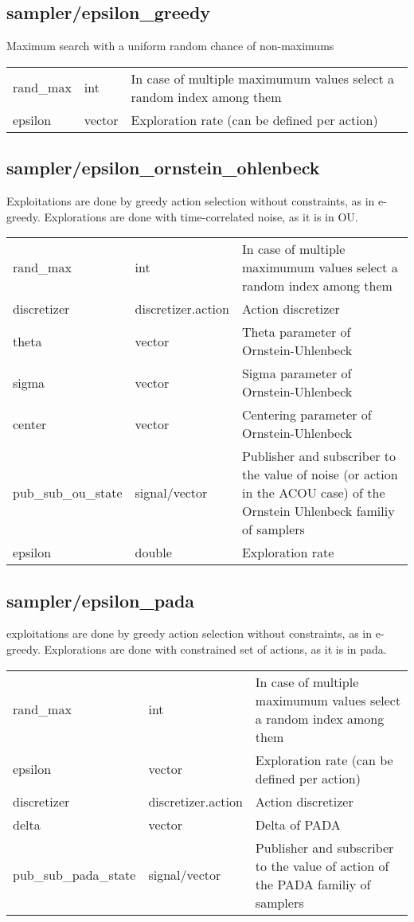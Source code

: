 \subsection{sampler/epsilon\_greedy}
\noindent Maximum search with a uniform random chance of non-maximums\\

\noindent\begin{tabular}{@{}lll@{}}
rand\_max&int&In case of multiple maximumum values select a random index among them\\
epsilon&vector&Exploration rate (can be defined per action)\\
\end{tabular}
\subsection{sampler/epsilon\_ornstein\_ohlenbeck}
\noindent Exploitations are done by greedy action selection without constraints, as in e-greedy. Explorations are done with time-correlated noise, as it is in OU.\\

\noindent\begin{tabular}{@{}lll@{}}
rand\_max&int&In case of multiple maximumum values select a random index among them\\
discretizer&discretizer.action&Action discretizer\\
theta&vector&Theta parameter of Ornstein-Uhlenbeck\\
sigma&vector&Sigma parameter of Ornstein-Uhlenbeck\\
center&vector&Centering parameter of Ornstein-Uhlenbeck\\
pub\_sub\_ou\_state&signal/vector&Publisher and subscriber to the value of noise (or action in the ACOU case) of the Ornstein Uhlenbeck familiy of samplers\\
epsilon&double&Exploration rate\\
\end{tabular}
\subsection{sampler/epsilon\_pada}
\noindent exploitations are done by greedy action selection without constraints, as in e-greedy. Explorations are done with constrained set of actions, as it is in pada.\\

\noindent\begin{tabular}{@{}lll@{}}
rand\_max&int&In case of multiple maximumum values select a random index among them\\
epsilon&vector&Exploration rate (can be defined per action)\\
discretizer&discretizer.action&Action discretizer\\
delta&vector&Delta of PADA\\
pub\_sub\_pada\_state&signal/vector&Publisher and subscriber to the value of action of the PADA familiy of samplers\\
\end{tabular}
